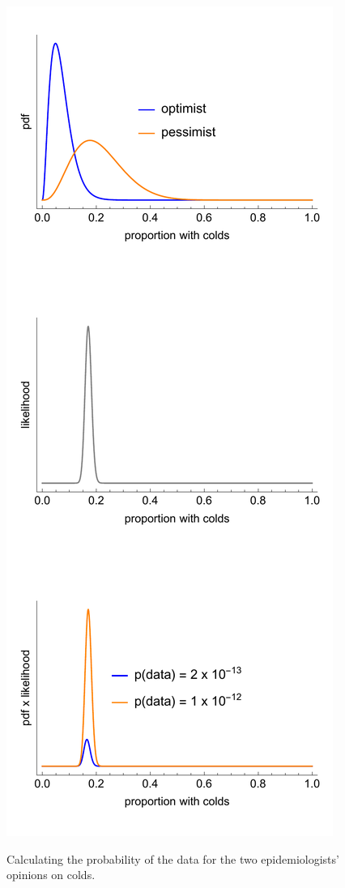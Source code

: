 \documentclass[11pt,fullpage]{book}
\begin{document}
\begin{figure}
\centering
\scalebox{0.45} 
{\includegraphics{Posterior_bayesFactorFluEpidemiologist.pdf}}
\caption{Calculating the probability of the data for the two epidemiologists' opinions on colds.}\label{fig:Posterior_bayesFactorFluEpidemiologist}
\end{figure}
\end{document}
